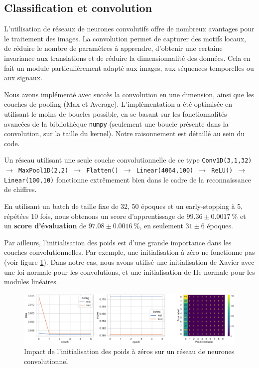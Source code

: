 \documentclass{article}
\begin{document}
\subsection{Classification et convolution}

L'utilisation de réseaux de neurones convolutifs offre de nombreux avantages pour le traitement des images. La convolution permet de capturer des motifs locaux, de réduire le nombre de paramètres à apprendre, d'obtenir une certaine invariance aux translations et de réduire la dimensionnalité des données. Cela en fait un module particulièrement adapté aux images, aux séquences temporelles ou aux signaux.

Nous avons implémenté avec succès la convolution en une dimension, ainsi que les couches de pooling (Max et Average). L'implémentation a été optimisée en utilisant le moins de boucles possible, en se basant sur les fonctionnalités avancées de la bibliothèque \texttt{numpy} (seulement une boucle présente dans la convolution, sur la taille du kernel). Notre raisonnement est détaillé au sein du code.

Un réseau utilisant une seule couche convolutionnelle de ce type \texttt{Conv1D(3,1,32) $\rightarrow$ MaxPool1D(2,2) $\rightarrow$ Flatten() $\rightarrow$ Linear(4064,100) $\rightarrow$ ReLU() $\rightarrow$ Linear(100,10)} fonctionne extrêmement bien dans le cadre de la reconnaissance de chiffres.

En utilisant un batch de taille fixe de 32, 50 époques et un early-stopping à 5, répétées 10 fois, nous obtenons un score d'apprentissage de $99.36 \pm 0.0017~\%$ et un \textbf{score d'évaluation} de $\mathbf{97.08 \pm 0.0016~\%}$, en seulement $31 \pm 6$ époques.

Par ailleurs, l'initialisation des poids est d'une grande importance dans les couches convolutionnelles. Par exemple, une initialisation à zéro ne fonctionne pas (voir figure \ref{fig:convinit}). Dans notre cas, nous avons utilisé une initialisation de Xavier avec une loi normale pour les convolutions, et une initialisation de He normale pour les modules linéaires.

\begin{figure}[htbp]
    \centering
    \includegraphics[width=\textwidth]{conv/conv_32batch_zeros.pdf}
    \caption{Impact de l'initialisation des poids à zéros sur un réseau de neurones convolutionnel}
    \label{fig:convinit}
\end{figure}
\end{document}
